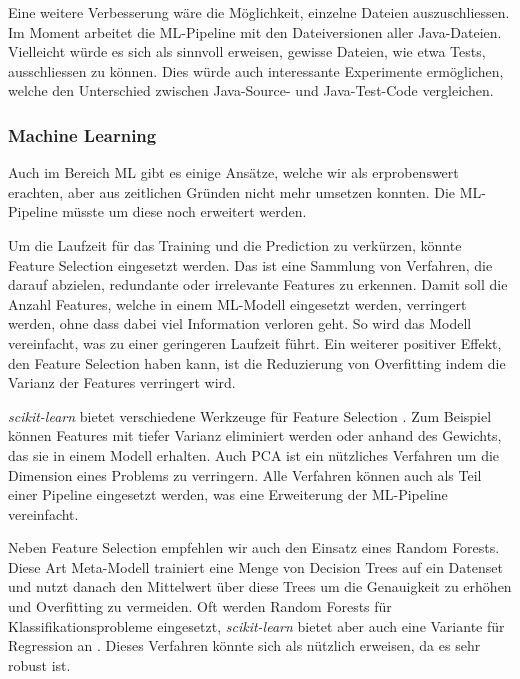 \documentclass[10pt, a4paper]{article}
\begin{document}
Eine weitere Verbesserung wäre die Möglichkeit, einzelne Dateien auszuschliessen. Im Moment arbeitet die ML-Pipeline mit den Dateiversionen aller Java-Dateien. Vielleicht würde es sich als sinnvoll erweisen, gewisse Dateien, wie etwa Tests, ausschliessen zu können. Dies würde auch interessante Experimente ermöglichen, welche den Unterschied zwischen Java-Source- und Java-Test-Code vergleichen.

\subsubsection{Machine Learning}

Auch im Bereich \ac{ML} gibt es einige Ansätze, welche wir als erprobenswert erachten, aber aus zeitlichen Gründen nicht mehr umsetzen konnten. Die ML-Pipeline müsste um diese noch erweitert werden.

Um die Laufzeit für das Training und die Prediction zu verkürzen, könnte Feature Selection eingesetzt werden.	Das ist eine Sammlung von Verfahren, die darauf abzielen, redundante oder irrelevante Features zu erkennen. Damit soll die Anzahl Features, welche in einem \ac{ML}-Modell eingesetzt werden, verringert werden, ohne dass dabei viel Information verloren geht. So wird das Modell vereinfacht, was zu einer geringeren Laufzeit führt. Ein weiterer positiver Effekt, den Feature Selection haben kann, ist die Reduzierung von Overfitting indem die Varianz der Features verringert wird.

\emph{scikit-learn} bietet verschiedene Werkzeuge für Feature Selection \cite{scikitlearnfeatureselection}. Zum Beispiel können Features mit tiefer Varianz eliminiert werden oder anhand des Gewichts, das sie in einem Modell erhalten. Auch \ac{PCA} \cite{scikitlearnpca} ist ein nützliches Verfahren um die Dimension eines Problems zu verringern. Alle Verfahren können auch als Teil einer Pipeline eingesetzt werden, was eine Erweiterung der ML-Pipeline vereinfacht.

Neben Feature Selection empfehlen wir auch den Einsatz eines Random Forests. Diese Art Meta-Modell trainiert eine Menge von Decision Trees auf ein Datenset und nutzt danach den Mittelwert über diese Trees um die Genauigkeit zu erhöhen und Overfitting zu vermeiden. Oft werden Random Forests für Klassifikationsprobleme eingesetzt, \emph{scikit-learn} bietet aber auch eine Variante für Regression an \cite{scikitlearnrandomforest}. Dieses Verfahren könnte sich als nützlich erweisen, da es sehr robust ist.
\end{document}

